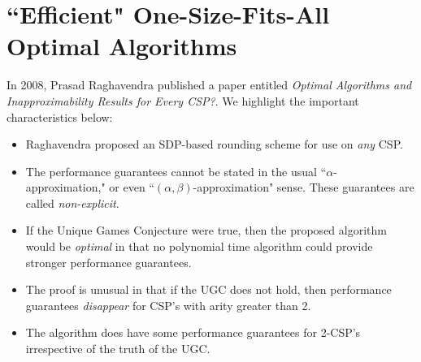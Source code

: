%
%
%
%
%
\section{``Efficient" One-Size-Fits-All Optimal Algorithms}
In 2008, Prasad Raghavendra published a paper entitled \textit{Optimal Algorithms and Inapproximability Results for Every CSP?}. We highlight the important characteristics below:

\begin{itemize}
\item Raghavendra proposed an SDP-based rounding scheme for use on \textit{any} CSP.
\item The performance guarantees cannot be stated in the usual ``$\alpha$-approximation," or even ``$(\alpha,\beta)$-approximation" sense.  These guarantees are called \textit{non-explicit}.
\item If the Unique Games Conjecture were true, then the proposed algorithm would be \textit{optimal} in that no polynomial time algorithm could provide stronger performance guarantees.
\item The proof is unusual in that if the UGC does not hold, then performance guarantees \textit{disappear} for CSP's with arity greater than 2.
\item The algorithm does have some performance guarantees for 2-CSP's irrespective of the truth of the UGC.
\end{itemize}

